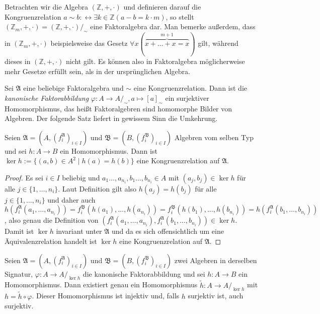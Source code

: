 \begin{example}
    Betrachten wir die Algebra $(\mathbb{Z},+,\cdot)$ und definieren darauf die Kongruenzrelation
    $a\sim b:\leftrightarrow \exists k\in\mathbb{Z}(a-b=k\cdot m)$, so stellt $(\mathbb{Z}_m,+,\cdot)=(\mathbb{Z},+,\cdot)/_\sim$
    eine Faktoralgebra dar. Man bemerke außerdem, dass in $(\mathbb{Z}_m,+,\cdot)$ beispielsweise das Gesetz
    $\forall x(\overbrace{x +\ldots+ x=x}^{m+1})$ gilt, während dieses in $(\mathbb{Z},+,\cdot)$ nicht gilt. Es können also in Faktoralgebra
    möglicherweise mehr Gesetze erfüllt sein, als in der ursprünglichen Algebra.
\end{example}

\begin{remark}
    Sei $\mathfrak{A}$ eine beliebige Faktoralgebra und $\sim$ eine Kongruenzrelation. Dann ist die \emph{kanonische Faktorabbildung}
    $\varphi:A\to A/_\sim, a\mapsto [a]_\sim$ ein surjektiver Homomorphismus, das heißt
    Faktoralgebren sind homomorphe Bilder von Algebren. Der folgende Satz liefert in gewissem Sinn die Umkehrung.
\end{remark}

\begin{lemma}
    Seien $\mathfrak{A}=(A,(f^\mathfrak{A}_i)_{i\in I})$ und $\mathfrak{B}=(B,(f^\mathfrak{B}_i)_{i\in I})$ Algebren vom selben Typ
    und sei $h:A\to B$ ein Homomorphismus. Dann ist $\ker h:=\{(a,b)\in A^2\mid h(a)=h(b)\}$ eine Kongruenzrelation auf $\mathfrak{A}$.
\end{lemma}

\begin{proof}
    Es sei $i\in I$ beliebig und $a_1\ldots,a_{n_i},b_1\ldots,b_{n_i}\in A$ mit $(a_j,b_j)\in \ker h$ für alle $j\in \{1,\ldots,n_i\}$.
    Laut Definition gilt also $h(a_j)=h(b_j)$ für alle $j\in\{1,\ldots,n_i\}$ und daher auch
    $h(f^\mathfrak{A}_i(a_1,\ldots,a_{n_i}))=f^\mathfrak{B}_i(h(a_1),\ldots,h(a_{n_i}))=f^\mathfrak{B}_i(h(b_1),\ldots,h(b_{n_i}))=h(f^\mathfrak{A}_i(b_1,\ldots,b_{n_i}))$,
    also genau die Definition von $(f^\mathfrak{A}_i(a_1,\ldots,a_{n_i}),f^\mathfrak{A}_i(b_1,\ldots,b_{n_i}))\in\ker h$. Damit ist $\ker h$ invariant unter $\mathfrak{A}$
    und da es sich offensichtlich um eine Äquivalenzrelation handelt ist $\ker h$ eine Kongruenzrelation auf $\mathfrak{A}$.
\end{proof}

\begin{theorem}[Homomorphiesatz]
    Seien $\mathfrak{A}=(A,(f^\mathfrak{A}_i)_{i\in I})$ und $\mathfrak{B}=(B,(f^\mathfrak{B}_i)_{i\in I})$ zwei Algebren
    in derselben Signatur, $\varphi:A\to A/_{\ker h}$ die kanonische Faktorabbildung und sei $h:A\to B$ ein Homomorphismus.
    Dann existiert genau ein Homomorphismus $\tilde{h}:A\to A/_{\ker h}$ mit $h=\tilde{h}\circ \varphi$. Dieser Homomorphismus
    ist injektiv und, falls $h$ surjektiv ist, auch surjektiv.
\end{theorem}


